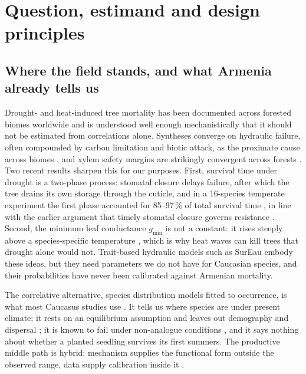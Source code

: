 \section{Question, estimand and design principles}\label{sec:design}

\subsection{Where the field stands, and what Armenia already tells us}
Drought- and heat-induced tree mortality has been documented across forested biomes worldwide \citep{Allen2010} and is understood well enough mechanistically that it should not be estimated from correlations alone. Syntheses converge on hydraulic failure, often compounded by carbon limitation and biotic attack, as the proximate cause across biomes \citep{McDowell2008,Adams2017,Choat2018,Hartmann2018}, and xylem safety margins are strikingly convergent across forests \citep{Choat2012}. Two recent results sharpen this for our purposes. First, survival time under drought is a two-phase process: stomatal closure delays failure, after which the tree drains its own storage through the cuticle, and in a 16-species temperate experiment the first phase accounted for 85--97\,\% of total survival time \citep{Waite2026,Gauthey2026}, in line with the earlier argument that timely stomatal closure governs resistance \citep{MartinStPaul2017}. Second, the minimum leaf conductance $g_{\min}$ is not a constant: it rises steeply above a species-specific temperature \citep{Cochard2019,Duursma2019}, which is why heat waves can kill trees that drought alone would not. Trait-based hydraulic models such as SurEau \citep{Cochard2021,Ruffault2022} embody these ideas, but they need parameters we do not have for Caucasian species, and their probabilities have never been calibrated against Armenian mortality.

The correlative alternative, species distribution models fitted to occurrence, is what most Caucasus studies use \citep{Pshegusov2022,Dagtekin2020}. It tells us where species are under present climate; it rests on an equilibrium assumption and leaves out demography and dispersal \citep{Guisan2005}; it is known to fail under non-analogue conditions \citep{Pearson2003,Fitzpatrick2009,Elith2010}, and it says nothing about whether a planted seedling survives its first summers. The productive middle path is hybrid: mechanism supplies the functional form outside the observed range, data supply calibration inside it \citep{Kearney2009,Reichstein2019}.

